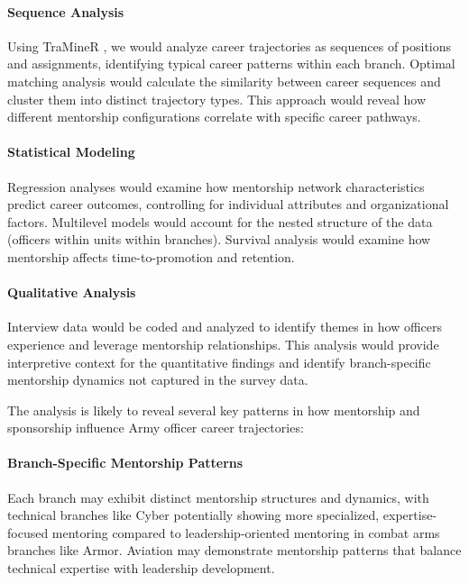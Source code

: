 \documentclass[main.tex]{subfiles}
\begin{document}
\paragraph{Sequence Analysis} Using TraMineR \cite{traminer2023sequence}, we would analyze career trajectories as sequences of positions and assignments, identifying typical career patterns within each branch. Optimal matching analysis would calculate the similarity between career sequences and cluster them into distinct trajectory types. This approach would reveal how different mentorship configurations correlate with specific career pathways.

\paragraph{Statistical Modeling} Regression analyses would examine how mentorship network characteristics predict career outcomes, controlling for individual attributes and organizational factors. Multilevel models would account for the nested structure of the data (officers within units within branches). Survival analysis would examine how mentorship affects time-to-promotion and retention.

\paragraph{Qualitative Analysis} Interview data would be coded and analyzed to identify themes in how officers experience and leverage mentorship relationships. This analysis would provide interpretive context for the quantitative findings and identify branch-specific mentorship dynamics not captured in the survey data.


The analysis is likely to reveal several key patterns in how mentorship and sponsorship influence Army officer career trajectories:

\paragraph{Branch-Specific Mentorship Patterns} Each branch may exhibit distinct mentorship structures and dynamics, with technical branches like Cyber potentially showing more specialized, expertise-focused mentoring compared to leadership-oriented mentoring in combat arms branches like Armor. Aviation may demonstrate mentorship patterns that balance technical expertise with leadership development.
\end{document}
